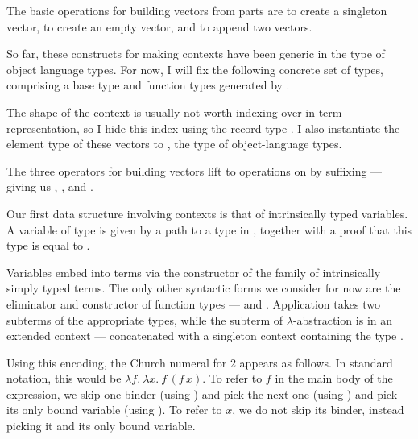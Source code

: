 
The basic operations for building vectors from parts are \AgdaFunction{[\_]} to
create a singleton vector, \AgdaFunction{[]} to create an empty vector, and
\AgdaFunction{\_++\_} to append two vectors.

So far, these constructs for making contexts have been generic in the type of
object language types.
For now, I will fix the following concrete set of types, comprising a base type
\AgdaInductiveConstructor{$\iota$} and function types generated by
.


The shape of the context is usually not worth indexing over in term
representation, so I hide this index using the record type .
I also instantiate the element type of these vectors to , the
type of object-language types.

\Ctx{}

The three operators for building vectors lift to operations on 
by suffixing  --- giving us ,
, and .

Our first data structure involving contexts is that of intrinsically typed
variables.
A variable of type
\AgdaBound{$\Gamma$}\AgdaSpace{}\AgdaRecord{$\ni$}\AgdaSpace{}
is given by a path  to a type in \AgdaBound{$\Gamma$}, together
with a proof  that this type is equal to .

\Var{}

Variables embed into terms via the  constructor of
the family  of intrinsically simply typed terms.
The only other syntactic forms we consider for now are the eliminator and
constructor of function types  ---
 and .
Application  takes two subterms of the appropriate
types, while the subterm of $\lambda$-abstraction 
is in an extended context \GA{} --- \AgdaBound{$\Gamma$} concatenated with a
singleton context containing the type .

\Term{}

Using this encoding, the Church numeral for 2 appears as follows.
In standard notation, this would be
$\lambda f.~\lambda x.~f\,(f\,x)$.
To refer to $f$ in the main body of the expression, we skip one binder (using
\AgdaInductiveConstructor{$\swarrow$}) and pick the next one
(using \AgdaInductiveConstructor{$\searrow$}) and pick its only bound variable
(using ).
To refer to $x$, we do not skip its binder, instead picking it and its only
bound variable.

